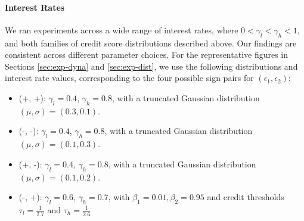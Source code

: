 \paragraph{Interest Rates}  
We ran experiments across a wide range of interest rates, where $0 < \gamma_l < \gamma_h < 1$, and both families of credit score distributions described above. Our findings are consistent across different parameter choices. For the representative figures in Sections \ref{sec:exp-dyna} and \ref{sec:exp-dist}, we use the following distributions and interest rate values, corresponding to the four possible sign pairs for $(\epsilon_1, \epsilon_2)$:
\begin{itemize}
    \item (+, +): $\gamma_l = 0.4$, $\gamma_h = 0.8$, with a truncated Gaussian distribution $(\mu, \sigma) = (0.3, 0.1)$.
    \item (-, -): $\gamma_l = 0.4$, $\gamma_h = 0.8$, with a truncated Gaussian distribution $(\mu, \sigma) = (0.1, 0.3)$.
    \item (+, -): $\gamma_l = 0.4$, $\gamma_h = 0.8$, with a truncated Gaussian distribution $(\mu, \sigma) = (0.1, 0.2)$.
    \item (-, +): $\gamma_l = 0.6$, $\gamma_h = 0.7$, with $\beta_1 = 0.01, \beta_2 = 0.95$ and credit thresholds $\tau_l = \frac{1}{2.7}$ and $\tau_h = \frac{1}{2.6}$ 
\end{itemize}